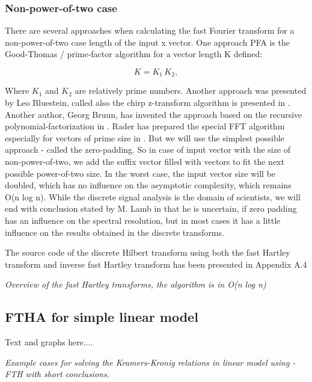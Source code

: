 \documentclass[12pt,twoside,a4paper]{article}
\numberwithin{equation}{subsection}
\numberwithin{figure}{subsection}
\begin{document}
\subsubsection*{Non-power-of-two case}

There are several approaches when calculating the fast Fourier transform for a non-power-of-two case length of the input x vector. 
One approach PFA is the Good-Thomas \cite{Good_interaction} / prime-factor algorithm for a vector length K defined:

\begin{equation}  \label{eq:hartley_goodk}
  K={K_{1}}\,{K_{2}},
\end{equation}

Where ${K_{1}}$ and ${K_{2}}$ are relatively prime numbers. Another approach was presented by Leo Bluestein, called also the chirp
z-transform algorithm is presented in \cite{bluestein_linear}. Another author, Georg Bruun, has invented the approach based on
the recursive polynomial-factorization in \cite{bruun_ztransform}. Rader has prepared the special FFT algorithm especially for
vectors of prime size in \cite{rader_dicrete}. But we will use the simplest possible approach - called the zero-padding. So in case
of input vector with the size of non-power-of-two, we add the suffix vector filled with vectors to fit the next possible
power-of-two size. In the worst case, the input vector size will be doubled, which has no influence on the asymptotic complexity,
which remains O(n log n). While the discrete signal analysis is the domain of scientists, we will end with conclusion stated by M.
Lamb in \cite{lamb_issues} that he is uncertain, if zero padding has an influence on the spectral resolution, but in most cases it
has a little influence on the results obtained in the discrete transforms.

The source code of the discrete Hilbert transform using both the fast Hartley transform and inverse fast Hartley transform has been
presented in Appendix A.4

\textit{Overview of the fast Hartley transforms, the algorithm is in O(n log n)}

\subsection{FTHA for simple linear model} \label{chap:hartley_lin}

Text and graphs here.... 

\textit{Example cases for solving the Kramers-Kronig relations in linear model using  - FTH with short conclusions.}
\end{document}
